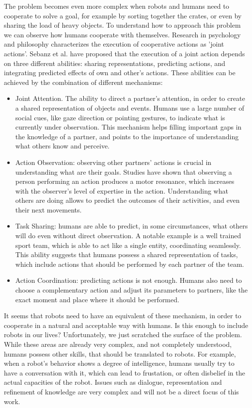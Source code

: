 The problem becomes even more complex when robots and humans need to cooperate to solve a goal, for example by sorting together the crates, or even by sharing the load of heavy objects. To understand  how to approach this problem we can observe how humans cooperate with themselves. Research in psychology and philosophy \cite{pacherie2012phenomenology} characterizes the execution of cooperative actions as 'joint actions'. Sebanz et al. \cite{sebanz2006joint} have proposed that the execution of a joint action depends on three different abilities: sharing representations, predicting actions, and integrating predicted effects of own and other's actions. These abilities can be achieved by the combination of different mechanisms:
\begin{itemize}
\item Joint Attention. The ability to direct a partner's attention, in order to create a shared representation of objects and events. Humans use a large number of social cues, like gaze direction or pointing gestures, to indicate what is currently under observation. This mechanism helps filling important gaps in the knowledge of a partner, and points to the importance of understanding what others know and perceive.
\item Action Observation: observing other partners' actions is crucial in understanding what are their goals. Studies have shown that observing a person performing an action produces a motor resonance, which increases with the observer's level of expertise in the action. Understanding what others are doing allows to predict the outcomes of their activities, and even their next movements.
\item Task Sharing: humans are able to predict, in some circumstances, what others will do  even without direct observation. A notable example is a well trained sport team, which is able to act like a single entity, coordinating seamlessly. This ability suggests that humans possess a shared representation of tasks, which include actions that should be performed by each partner of the team.
\item Action Coordination: predicting actions is not enough. Humans also need to choose a complementary action and adjust its parameters to partners, like the exact moment and place where it should be performed. 
\end{itemize}

It seems that robots need to have an equivalent of these mechanism, in order to cooperate in a natural and acceptable way with humans. Is this enough to include robots in our lives? Unfortunately, we just scratched the surface of the problem. While these areas are already very complex, and not completely understood, humans possess other skills, that should be translated to robots. For example, when a robot's behavior shows a degree of intelligence, humans usually try to have a conversation with it, which can lead to frustation, or often disbelief in the actual capacities of the robot. Issues such as dialogue, representation and refinement of knowledge are very complex and will not be a direct focus of this work.

